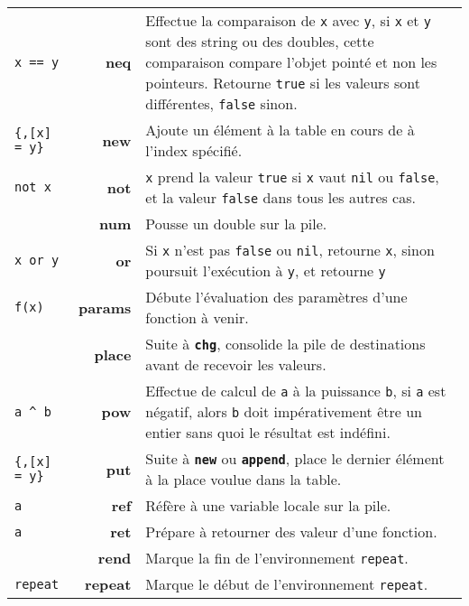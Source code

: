 \documentclass{article}
\begin{document}
\begin{longtable}{p{2cm} r p{12cm}}
  {\lstinline$x == y$} & \textbf{neq} & Effectue la comparaison de \texttt{x} avec \texttt{y}, si \texttt{x} et \texttt{y} sont des string ou des doubles, cette comparaison compare l'objet pointé et non les pointeurs. Retourne {\lstset{style=lua}\lstinline$true$} si les valeurs sont différentes, {\lstset{style=lua}\lstinline$false$} sinon.\\
  {\lstset{style=lua}\lstinline${,[x] = y}$} & \textbf{new} & Ajoute un élément à la table en cours de à l'index spécifié.\\
  {\lstset{style=lua}\lstinline$not x$} & \textbf{not} & \texttt{x} prend la valeur {\lstset{style=lua}\lstinline$true$} si \texttt{x} vaut {\lstset{style=lua}\lstinline$nil$} ou {\lstset{style=lua}\lstinline$false$}, et la valeur {\lstset{style=lua}\lstinline$false$} dans tous les autres cas.\\
  & \textbf{num} & Pousse un double sur la pile.\\
  {\lstinline$x or y$} & \textbf{or} & Si \texttt{x} n'est pas {\lstset{style=lua}\lstinline$false$} ou {\lstset{style=lua}\lstinline$nil$}, retourne \texttt{x}, sinon poursuit l'exécution à \texttt{y}, et retourne \texttt{y}\\
  {\lstset{style=lua}\lstinline$f(x)$} & \textbf{params} & Débute l'évaluation des paramètres d'une fonction à venir.\\
  & \textbf{place} & Suite à \texttt{\textbf{chg}}, consolide la pile de destinations avant de recevoir les valeurs.\\
  {\lstinline$a ^ b$} & \textbf{pow} & Effectue de calcul de \texttt{a} à la puissance \texttt{b}, si \texttt{a} est négatif, alors \texttt{b} doit impérativement être un entier sans quoi le résultat est indéfini.\\
  {\lstset{style=lua}\lstinline${,[x] = y}$} & \textbf{put} & Suite à \texttt{\textbf{new}} ou \texttt{\textbf{append}}, place le dernier élément à la place voulue dans la table.\\
  {\lstset{style=lua}\lstinline$a$} & \textbf{ref} & Réfère à une variable locale sur la pile.\\
  {\lstset{style=lua}\lstinline$a$} & \textbf{ret} & Prépare à retourner des valeur d'une fonction.\\
   & \textbf{rend} & Marque la fin de l'environnement {\lstset{style=lua}\lstinline$repeat$}.\\
  {\lstset{style=lua}\lstinline$repeat$} & \textbf{repeat} & Marque le début de l'environnement {\lstset{style=lua}\lstinline$repeat$}.\\

\end{longtable}
\end{document}

